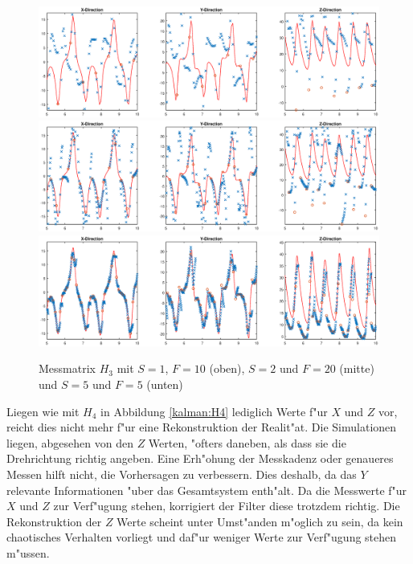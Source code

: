 \begin{refsection}
\begin{figure}
\centering
\includegraphics[width=\hsize]{kalman/figures/H3R10S1.eps}
\includegraphics[width=\hsize]{kalman/figures/H3R20S2.eps}
\includegraphics[width=\hsize]{kalman/figures/H3R05S5.eps}
\caption{Messmatrix $H_{3}$ mit $S=1$, $F=10$ (oben), $S=2$ und $F=20$ (mitte) und $S=5$ und $F=5$ (unten)}
\label{kalman:H3}
\end{figure}

Liegen wie mit $H_{4}$ in Abbildung \ref{kalman:H4} lediglich Werte f"ur $X$ und $Z$ vor, reicht dies nicht mehr f"ur eine Rekonstruktion der Realit"at. Die Simulationen liegen, abgesehen von den $Z$ Werten, "ofters daneben, als dass sie die Drehrichtung richtig angeben. Eine Erh"ohung der Messkadenz oder genaueres Messen hilft nicht, die Vorhersagen zu verbessern. Dies deshalb, da das $Y$ relevante Informationen "uber das Gesamtsystem enth"alt.
Da die Messwerte f"ur $X$ und $Z$ zur Verf"ugung stehen, korrigiert der Filter diese trotzdem richtig.
Die Rekonstruktion der $Z$ Werte scheint unter Umst"anden m"oglich zu sein, da kein chaotisches Verhalten vorliegt und daf"ur weniger Werte zur Verf"ugung stehen m"ussen.


\end{refsection}
